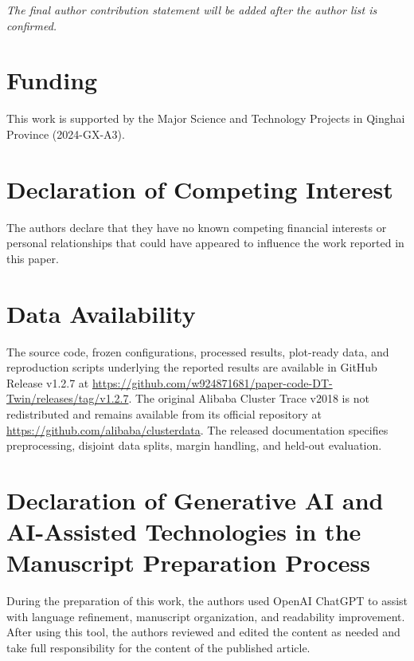 \documentclass[a4paper,fleqn]{cas-sc}
\begin{document}
\textit{The final author contribution statement will be added after the
author list is confirmed.}

\section*{Funding}

This work is supported by the Major Science and Technology Projects in Qinghai
Province (2024-GX-A3).

\section*{Declaration of Competing Interest}

The authors declare that they have no known competing financial
interests or personal relationships that could have appeared to
influence the work reported in this paper.

\section*{Data Availability}

The source code, frozen configurations, processed results, plot-ready data,
and reproduction scripts underlying the reported results are available in
GitHub Release v1.2.7 at
\url{https://github.com/w924871681/paper-code-DT-Twin/releases/tag/v1.2.7}.
The original Alibaba Cluster Trace v2018 is not redistributed and remains
available from its official repository at
\url{https://github.com/alibaba/clusterdata}. The released documentation
specifies preprocessing, disjoint data splits, margin handling, and
held-out evaluation.

\section*{Declaration of Generative AI and AI-Assisted Technologies
in the Manuscript Preparation Process}

During the preparation of this work, the authors used OpenAI ChatGPT to
assist with language refinement, manuscript organization, and readability
improvement. After using this tool, the authors reviewed and edited the
content as needed and take full responsibility for the content of the
published article.
\end{document}
